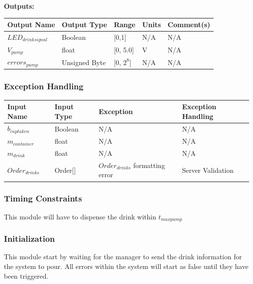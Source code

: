 \documentclass [10pt]{article}
\begin{document}
\textbf{Outputs: } \\

\begin{longtable}{|l|l|l|l|l|}\hline 
	\rowcolor{tableCell}\textbf{Output Name} & \textbf{Output Type} & \textbf{Range} & \textbf{Units} & \textbf{Comment(s)} \\ \hline
	$ LED_{drinksignal} $ & Boolean & [0,1] & N/A &  N/A\\ \hline
	\rowcolor{tableCell}$ V_{pump } $ & float & [0, 5.0]& V & N/A\\ \hline
	$  errors_{pump} $ & Unsigned Byte & [0, $2^{8}$]& N/A & N/A\\ \hline
\end{longtable}


\subsubsection{Exception Handling}

\begin{longtable}{|l|l|l|l|}\hline 
		\rowcolor{tableCell}\textbf{Input Name} & \textbf{Input Type} & \textbf{Exception} & \textbf{Exception Handling} \\ \hline
		$ b_{cuptaken} $ & Boolean & N/A &  N/A\\ \hline
		\rowcolor{tableCell}$ m_{container} $ & float & N/A & N/A \\ \hline
		$ m_{drink} $  & float & N/A & N/A \\ \hline
		\rowcolor{tableCell}$ Order_{drinks} $ & Order[] & $ Order_{drinks} $ formatting error & Server Validation \\ \hline
\end{longtable}


\subsubsection{Timing Constraints}
This module will have to dispense the drink within $ t_{maxpump} $


\subsubsection{Initialization}
This module start by waiting for the manager to send the drink information for the system to pour. All errors within the system will start as false until they have been triggered.
\end{document}
